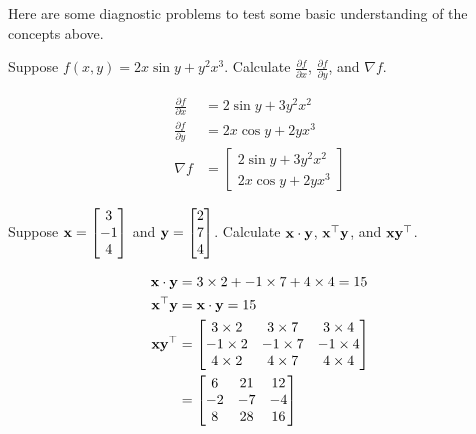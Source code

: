 \documentclass[assignment01_Solutions]{subfiles}
\begin{document}
\begin{exercise}[(20 minutes)]
Here are some diagnostic problems to test some basic understanding of the concepts above.
\bes
\item Suppose $f(x, y) = 2x \sin{y} + y^2 x^3$.  Calculate $\frac{\partial{f}}{\partial{x}}$, $\frac{\partial{f}}{\partial{y}}$, and $\nabla f$.


\begin{boxedsolution}
\begin{align}
\frac{\partial{f}}{\partial{x}} &= 2 \sin y + 3 y^2 x^2 \\
\frac{\partial{f}}{\partial{y}} &= 2x \cos y + 2 y x^3 \\ 
\nabla f &= \begin{bmatrix} 2 \sin y + 3 y^2 x^2 \\ 2x \cos y + 2 y x^3  \end{bmatrix}
\end{align}
\end{boxedsolution}

\item Suppose $\mathbf{x} = \begin{bmatrix} 3 \\ -1 \\ 4 \end{bmatrix}$ and $\mathbf{y} = \begin{bmatrix} 2 \\  7 \\ 4 \end{bmatrix}$.  Calculate $\mathbf{x} \cdot \mathbf{y}$, $\mathbf{x}^\top \mathbf{y}$, and $\mathbf{x} \mathbf{y}^\top$.


\begin{boxedsolution}
\begin{align}
\mathbf{x} \cdot \mathbf{y} &= 3 \times 2 + -1 \times 7 + 4 \times 4 = 15 \\
\mathbf{x}^\top \mathbf{y} &= \mathbf{x} \cdot \mathbf{y} = 15 \\
\mathbf{x} \mathbf{y}^\top &= \begin{bmatrix} 3 \times 2 & 3 \times 7 & 3 \times 4 \\ -1 \times 2 & -1 \times 7 & -1 \times 4 \\ 4 \times 2 & 4 \times 7 & 4 \times 4 \end{bmatrix} \\
&= \begin{bmatrix} 6 & 21 & 12 \\ -2 & -7 & -4 \\ 8 & 28 & 16 \end{bmatrix}
\end{align}
\end{boxedsolution}


\end{exercise}
\end{document}
